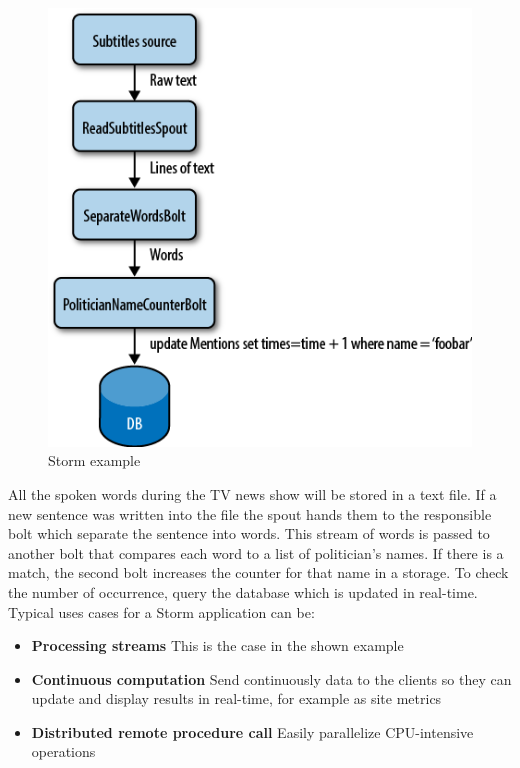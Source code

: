 \documentclass[a4paper]{article}
\begin{document}
\begin{figure}[h!]
	\centering
	\includegraphics[scale=0.5]{images/storm_example.png}
	\caption{Storm example}
	\label{storm_example}
\end{figure}
All the spoken words during the TV news show will be stored in a text file. If a new sentence was written into the file the spout hands them to the responsible bolt which separate the sentence into words. This stream of words is passed to another bolt that compares each word to a list of politician's names. If there is a match, the second bolt increases the counter for that name in a storage. To check the number of occurrence, query the database which is updated in real-time.\\
Typical uses cases for a Storm application can be:
\begin{itemize}
	\item \textbf{Processing streams} This is the case in the shown example 
	\item \textbf{Continuous computation} Send continuously data to the clients so they can update and display results in real-time, for example as site metrics 
	\item \textbf{Distributed remote procedure call} Easily parallelize CPU-intensive operations
\end{itemize}
\end{document}
